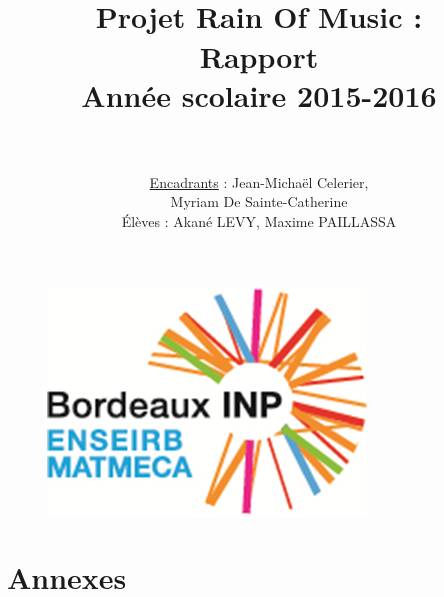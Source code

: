 \documentclass[paper=a4,12pt]{article}
\title{
  \horrule{1.5pt} \\[0.5cm]	
  \Huge \textbf{Projet Rain Of Music : \\ Rapport} \\ [20pt]
    \LARGE Année scolaire 2015-2016 \\ 
  \horrule{1.5pt} \\[0.5cm]
}
\author{						
    \LARGE \underline{Encadrants} : Jean-Michaël Celerier, \\
   					\LARGE	\hspace{5cm} Myriam De Sainte-Catherine\\			
   	\vspace{1cm} 
   	\normalfont
   	\LARGE Élèves :  Akané LEVY, Maxime PAILLASSA    
}
\date{}
\numberwithin{equation}{section}		%
\numberwithin{figure}{section}			%
\numberwithin{table}{section}				%
\begin{document}
\graphicspath{{./imgs/}{.}}
\maketitle

\begin{figure}[H]
  \centering\includegraphics[scale=1.2]{logo_enseirb.png}
\end{figure}

\newpage

\tableofcontents

\newpage
\normalsize




\newpage













  \newpage

  
  
  \newpage

  \appendix
  \part*{Annexes}
  

\end{document}
